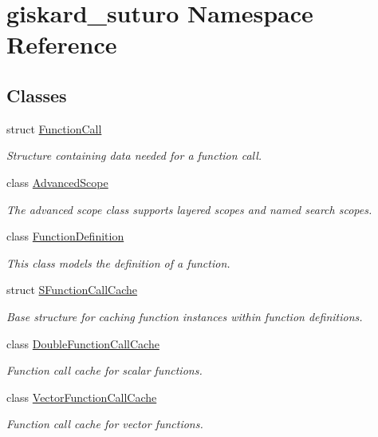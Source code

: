 \hypertarget{namespacegiskard__suturo}{\section{giskard\-\_\-suturo Namespace Reference}
\label{namespacegiskard__suturo}
}
\subsection*{Classes}
\begin{DoxyCompactItemize}
\item 
struct \hyperlink{structgiskard__suturo_1_1FunctionCall}{Function\-Call}
\begin{DoxyCompactList}\small\item\em Structure containing data needed for a function call. \end{DoxyCompactList}\item 
class \hyperlink{classgiskard__suturo_1_1AdvancedScope}{Advanced\-Scope}
\begin{DoxyCompactList}\small\item\em The advanced scope class supports layered scopes and named search scopes. \end{DoxyCompactList}\item 
class \hyperlink{classgiskard__suturo_1_1FunctionDefinition}{Function\-Definition}
\begin{DoxyCompactList}\small\item\em This class models the definition of a function. \end{DoxyCompactList}\item 
struct \hyperlink{structgiskard__suturo_1_1SFunctionCallCache}{S\-Function\-Call\-Cache}
\begin{DoxyCompactList}\small\item\em Base structure for caching function instances within function definitions. \end{DoxyCompactList}\item 
class \hyperlink{classgiskard__suturo_1_1DoubleFunctionCallCache}{Double\-Function\-Call\-Cache}
\begin{DoxyCompactList}\small\item\em Function call cache for scalar functions. \end{DoxyCompactList}\item 
class \hyperlink{classgiskard__suturo_1_1VectorFunctionCallCache}{Vector\-Function\-Call\-Cache}
\begin{DoxyCompactList}\small\item\em Function call cache for vector functions. \end{DoxyCompactList}\item 

\end{DoxyCompactItemize}
